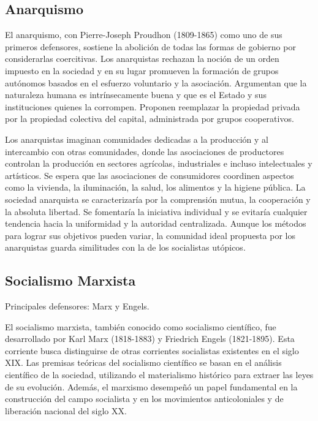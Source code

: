 \documentclass[
  jou,
  floatsintext,
  longtable,
  a4paper,
  nolmodern,
  notxfonts,
  notimes,
  12pt,
  colorlinks=true,linkcolor=blue,citecolor=blue,urlcolor=blue]{apa7}
\begin{document}
\subsection{Anarquismo}\label{anarquismo}

El anarquismo, con Pierre-Joseph Proudhon (1809-1865) como uno de sus
primeros defensores, sostiene la abolición de todas las formas de
gobierno por considerarlas coercitivas. Los anarquistas rechazan la
noción de un orden impuesto en la sociedad y en su lugar promueven la
formación de grupos autónomos basados en el esfuerzo voluntario y la
asociación. Argumentan que la naturaleza humana es intrínsecamente buena
y que es el Estado y sus instituciones quienes la corrompen. Proponen
reemplazar la propiedad privada por la propiedad colectiva del capital,
administrada por grupos cooperativos.

Los anarquistas imaginan comunidades dedicadas a la producción y al
intercambio con otras comunidades, donde las asociaciones de productores
controlan la producción en sectores agrícolas, industriales e incluso
intelectuales y artísticos. Se espera que las asociaciones de
consumidores coordinen aspectos como la vivienda, la iluminación, la
salud, los alimentos y la higiene pública. La sociedad anarquista se
caracterizaría por la comprensión mutua, la cooperación y la absoluta
libertad. Se fomentaría la iniciativa individual y se evitaría cualquier
tendencia hacia la uniformidad y la autoridad centralizada. Aunque los
métodos para lograr sus objetivos pueden variar, la comunidad ideal
propuesta por los anarquistas guarda similitudes con la de los
socialistas utópicos.

\subsection{Socialismo Marxista}\label{socialismo-marxista}

Principales defensores: Marx y Engels.

El socialismo marxista, también conocido como socialismo científico, fue
desarrollado por Karl Marx (1818-1883) y Friedrich Engels (1821-1895).
Esta corriente busca distinguirse de otras corrientes socialistas
existentes en el siglo XIX. Las premisas teóricas del socialismo
científico se basan en el análisis científico de la sociedad, utilizando
el materialismo histórico para extraer las leyes de su evolución.
Además, el marxismo desempeñó un papel fundamental en la construcción
del campo socialista y en los movimientos anticoloniales y de liberación
nacional del siglo XX.
\end{document}
